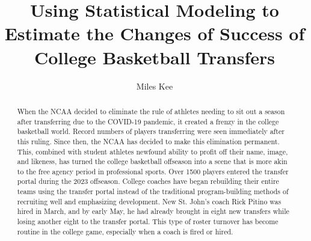 \documentclass[12pt]{article}
\title{Using Statistical Modeling to Estimate the Changes of Success of College Basketball Transfers}
\author{Miles Kee}
\begin{document}
\maketitle

\begin{abstract}
When the NCAA decided to eliminate the rule of athletes needing to sit out a season after transferring due to the COVID-19 pandemic, it created a frenzy in the college basketball world. Record numbers of players transferring were seen immediately after this ruling. Since then, the NCAA has decided to make this elimination permanent. This, combined with student athletes newfound ability to profit off their name, image, and likeness, has turned the college basketball offseason into a scene that is more akin to the free agency period in professional sports. Over 1500 players entered the transfer portal during the 2023 offseason. College coaches have began rebuilding their entire teams using the transfer portal instead of the traditional program-building methods of recruiting well and emphasizing development. New St. John's coach Rick Pitino was hired in March, and by early May, he had already brought in eight new transfers while losing another eight to the transfer portal. This type of roster turnover has become routine in the college game, especially when a coach is fired or hired. 
\end{abstract}
\end{document}
